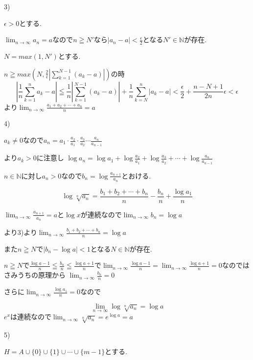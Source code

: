 \documentclass{jsarticle}
\begin{document}
       3)
       
       $\epsilon > 0$とする.
       
       $\displaystyle\lim_{n\to \infty}a_n=a$なので$n\geqq N'$なら$|a_n-a|<\frac{\epsilon}{2}$となる$N'\in \mathbb{N}$が存在.
       
       $N=max(1,N')$とする.
       
       $n\geqq max(N,\frac{2}{\epsilon}|\sum_{k=1}^{N-1}(a_k-a)|)$の時
       \[
       |\frac{1}{n}\sum_{k=1}^n a_k - a| \leqq \frac{1}{n}|\sum_{k=1}^{N-1}(a_k-a)|+\frac{1}{n}\sum_{k=N}^{n}|a_k-a|<\frac{\epsilon}{2} + \frac{n-N+1}{2n}\epsilon<\epsilon
       \]
       より$\displaystyle\lim_{n\to \infty}\frac{a_1+a_2+\cdots+a_n}{n}=a$
       
       4)
       
       $a_k\neq0$なので$a_n=a_1\cdot \frac{a_2}{a_1}\cdot \frac{a_3}{a_2}\cdots \frac{a_n}{a_{n-1}}$
       
       より$a_k>0$に注意し
       $\log a_n = \log a_1 + \log \frac{a_2}{a_1}+\log \frac{a_3}{a_2}+\cdots +\log \frac{a_n}{a_{n-1}}$
       
       $n\in\mathbb{N}$に対し$a_n > 0$なので$b_n=\log \frac{a_{n+1}}{a_n}$とおける.
       
       \[\log \sqrt[n]{a_n}=\frac{b_1+b_2+\cdots +b_n}{n} - \frac{b_n}{n}+\frac{\log a_1}{n}\]
       
       $\displaystyle\lim_{n\to \infty}\frac{a_{n+1}}{a_n}=a$と$\log x$が連続なので$\displaystyle\lim_{n\to \infty}b_n=\log a$
       
       より3)より$\displaystyle\lim _{n\to \infty}\frac{b_1+b_2+\cdots +b_n}{n} = \log a$
       
       また$n\geqq N$で$|b_n - \log a|<1$となる$N\in\mathbb{N}$が存在.
       
       $n\geqq N$で$\frac{\log a -1}{n}\leqq \frac{b_n}{n} \leqq \frac{\log a+1}{n}$で$\displaystyle\lim_{n\to\infty}\frac{\log a -1}{n} = \lim_{n\to\infty}\frac{\log a +1}{n}=0$なのではさみうちの原理から
       $\displaystyle\lim_{n\to\infty} \frac{b_n}{n} = 0$
       
       さらに$\displaystyle\lim_{n\to\infty} \frac{\log a_1}{n} = 0$なので
       
       
       \[\lim_{n\to\infty}\log \sqrt[n]{a_n} = \log a\]
       $e^x$は連続なので$\displaystyle\lim_{n\to\infty}\sqrt[n]{a_n} = e^{\log a} = a$
       
       5)
       
       $H = A\cup \{0\} \cup \{1\} \cup \cdots \cup \{m-1\}$とする.
       
\end{document}
